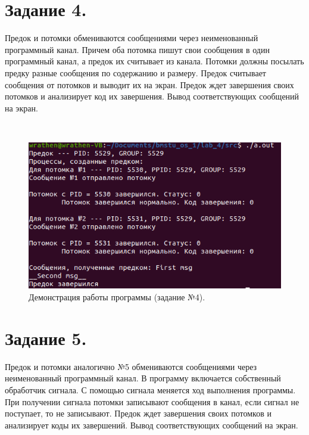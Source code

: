 \documentclass[12pt]{report}
\begin{document}
	\section*{Задание 4.}
	Предок и потомки обмениваются сообщениями через неименованный программный канал.
	Причем оба потомка пишут свои сообщения в один программный канал, а предок их считывает из канала.
	Потомки должны посылать предку разные сообщения по содержанию и размеру.
	Предок считывает сообщения от потомков и выводит их на экран.
	Предок ждет завершения своих потомков и анализирует код их завершения.
	Вывод соответствующих сообщений на экран.

	\begin{lstlisting}[label=code:pipe, caption=pipe(), language=C]
		
	\end{lstlisting}

	\begin{figure}[H]
		
		\centering
		
		\includegraphics[width=\linewidth]{img/task_04.png}
		\caption{Демонстрация работы программы (задание №4).}
		
		\label{fig:task_04}
		
	\end{figure}

	\section*{Задание 5.}
	Предок и потомки аналогично №5 обмениваются сообщениями через неименованный программный канал.
	В программу включается собственный обработчик сигнала.
	С помощью сигнала меняется ход выполнения программы.
	При получении сигнала потомки записывают сообщения в канал, если сигнал не поступает, то не записывают.
	Предок ждет завершения своих потомков и анализирует коды их завершений.
	Вывод соответствующих сообщений на экран.
	
\end{document}
